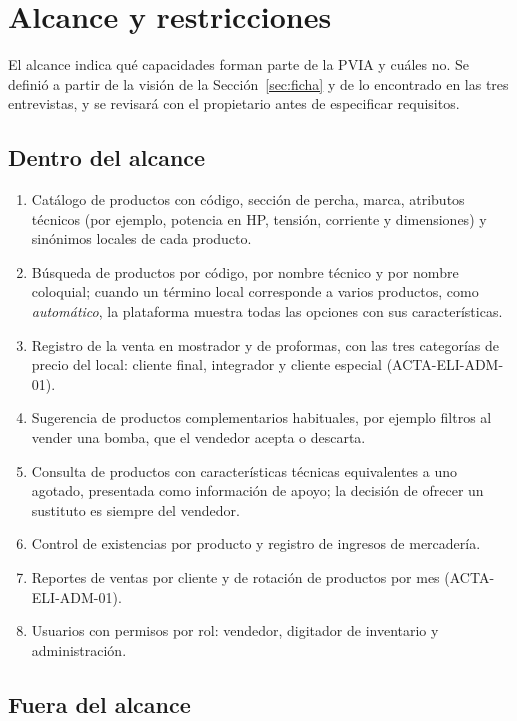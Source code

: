 \section{Alcance y restricciones}\label{sec:alcance}

El alcance indica qué capacidades forman parte de la PVIA y cuáles no. Se definió a partir de la visión de la Sección~\ref{sec:ficha} y de lo encontrado en las tres entrevistas, y se revisará con el propietario antes de especificar requisitos.

\subsection{Dentro del alcance}

\begin{enumerate}[label=AL-\arabic*, leftmargin=*]
\item Catálogo de productos con código, sección de percha, marca, atributos técnicos (por ejemplo, potencia en HP, tensión, corriente y dimensiones) y sinónimos locales de cada producto.
\item Búsqueda de productos por código, por nombre técnico y por nombre coloquial; cuando un término local corresponde a varios productos, como \emph{automático}, la plataforma muestra todas las opciones con sus características.
\item Registro de la venta en mostrador y de proformas, con las tres categorías de precio del local: cliente final, integrador y cliente especial (ACTA-ELI-ADM-01).
\item Sugerencia de productos complementarios habituales, por ejemplo filtros al vender una bomba, que el vendedor acepta o descarta.
\item Consulta de productos con características técnicas equivalentes a uno agotado, presentada como información de apoyo; la decisión de ofrecer un sustituto es siempre del vendedor.
\item Control de existencias por producto y registro de ingresos de mercadería.
\item Reportes de ventas por cliente y de rotación de productos por mes (ACTA-ELI-ADM-01).
\item Usuarios con permisos por rol: vendedor, digitador de inventario y administración.
\end{enumerate}

\subsection{Fuera del alcance}

